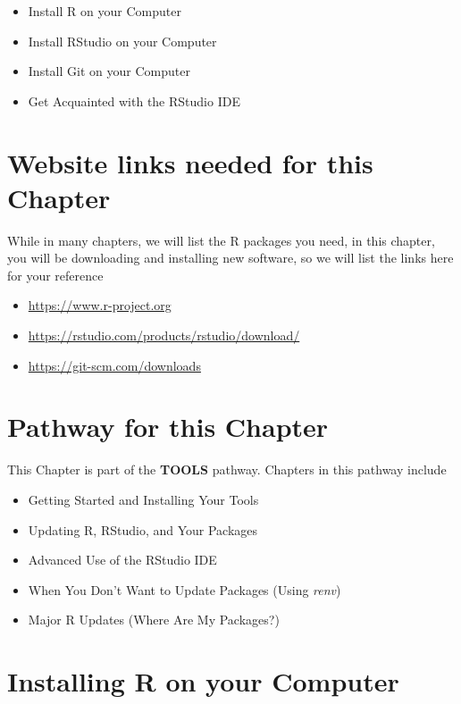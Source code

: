\documentclass[]{book}
\providecommand{\tightlist}{%
  \setlength{\itemsep}{0pt}\setlength{\parskip}{0pt}}
\begin{document}
\begin{itemize}
\tightlist
\item
  Install R on your Computer
\item
  Install RStudio on your Computer
\item
  Install Git on your Computer
\item
  Get Acquainted with the RStudio IDE
\end{itemize}

\hypertarget{website-links-needed-for-this-chapter}{%
\section{Website links needed for this Chapter}\label{website-links-needed-for-this-chapter}}

While in many chapters, we will list the R packages you need, in this chapter, you will be downloading and installing new software, so we will list the links here for your reference

\begin{itemize}
\tightlist
\item
  \url{https://www.r-project.org}
\item
  \url{https://rstudio.com/products/rstudio/download/}
\item
  \url{https://git-scm.com/downloads}
\end{itemize}

\hypertarget{pathway-for-this-chapter}{%
\section{Pathway for this Chapter}\label{pathway-for-this-chapter}}

This Chapter is part of the \textbf{TOOLS} pathway.
Chapters in this pathway include

\begin{itemize}
\tightlist
\item
  Getting Started and Installing Your Tools
\item
  Updating R, RStudio, and Your Packages
\item
  Advanced Use of the RStudio IDE
\item
  When You Don't Want to Update Packages (Using \emph{renv})
\item
  Major R Updates (Where Are My Packages?)
\end{itemize}

\hypertarget{installing-r-on-your-computer}{%
\section{Installing R on your Computer}\label{installing-r-on-your-computer}}
\end{document}
